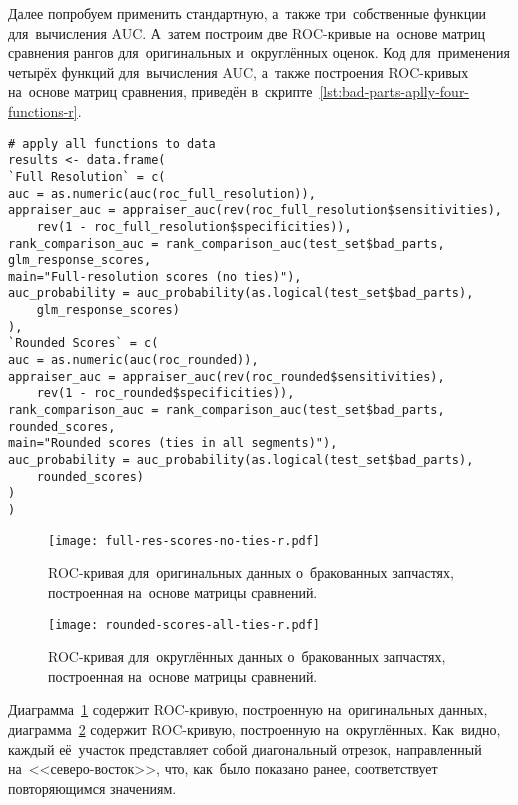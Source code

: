 \documentclass[]{scrreprt}
\begin{document}
Далее попробуем применить стандартную, а~также три~собственные функции для~вычисления AUC. А~затем построим две ROC-кривые на~основе матриц сравнения рангов для~оригинальных и~округлённых оценок. Код для~применения четырёх функций для~вычисления AUC, а~также построения ROC-кривых на~основе матриц сравнения, приведён в~скрипте~\ref{lst:bad-parts-aplly-four-functions-r}.
%
\begin{lstlisting}[float, caption = Применение четырёх функций для~вычимсления AUC и~построение ROC-кривых на~основе матриц сравнения для~оригинальных и~округлённых оценок, firstnumber=1, label= lst:bad-parts-aplly-four-functions-r]
# apply all functions to data
results <- data.frame(
`Full Resolution` = c(
auc = as.numeric(auc(roc_full_resolution)),
appraiser_auc = appraiser_auc(rev(roc_full_resolution$sensitivities),
	rev(1 - roc_full_resolution$specificities)),
rank_comparison_auc = rank_comparison_auc(test_set$bad_parts,
glm_response_scores, 
main="Full-resolution scores (no ties)"),
auc_probability = auc_probability(as.logical(test_set$bad_parts),
	glm_response_scores)
),
`Rounded Scores` = c( 
auc = as.numeric(auc(roc_rounded)),
appraiser_auc = appraiser_auc(rev(roc_rounded$sensitivities),
	rev(1 - roc_rounded$specificities)),
rank_comparison_auc = rank_comparison_auc(test_set$bad_parts, rounded_scores,
main="Rounded scores (ties in all segments)"),
auc_probability = auc_probability(as.logical(test_set$bad_parts),
	rounded_scores)
)
)
\end{lstlisting}
%
\begin{figure}[ht]
	\centering
	\texttt{[image: full-res-scores-no-ties-r.pdf]}
	\caption{ROC-кривая для~оригинальных данных о~бракованных запчастях, построенная на~основе матрицы сравнений.}
	\label{fig:bad-parts-ROC-original-r}
\end{figure}
%
\begin{figure}[ht]
	\centering
	\texttt{[image: rounded-scores-all-ties-r.pdf]}
	\caption{ROC-кривая для~округлённых данных о~бракованных запчастях, построенная на~основе матрицы сравнений.}
	\label{fig:bad-parts-ROC-rounded-r}
\end{figure}
%

Диаграмма~\ref{fig:bad-parts-ROC-original-r} содержит ROC-кривую, построенную на~оригинальных данных, диаграмма~\ref{fig:bad-parts-ROC-rounded-r} содержит ROC-кривую, построенную на~округлённых. Как~видно, каждый её~участок представляет собой диагональный отрезок, направленный на~<<северо-восток>>, что, как~было показано ранее, соответствует повторяющимся значениям.
\end{document}
